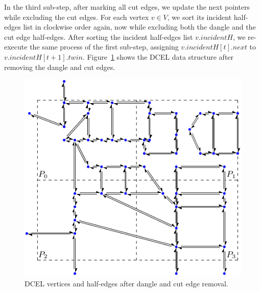 In the third sub-step, after marking all cut edges, we update the next pointers while excluding the cut edges. 
For each vertex $v \in V$, we sort its incident half-edges list in clockwise order again, now while excluding both the dangle and the cut edge half-edges.
After sorting the incident half-edges list $v.incidentH$, we re-execute the same process of the first sub-step, assigning $v.incidentH[t].next$ to $v.incidentH[t+1].twin$. 
Figure~\ref{fig:ddcel:step2} shows the DCEL data structure after removing the dangle and cut edges.


\begin{figure}[tb]
	\centering
	\includegraphics[width=0.75 \linewidth ]{chapter2/model/ddcel-2}
	\caption{DCEL vertices and half-edges after dangle and cut edge removal.}
	\label{fig:ddcel:step2}
\end{figure}

